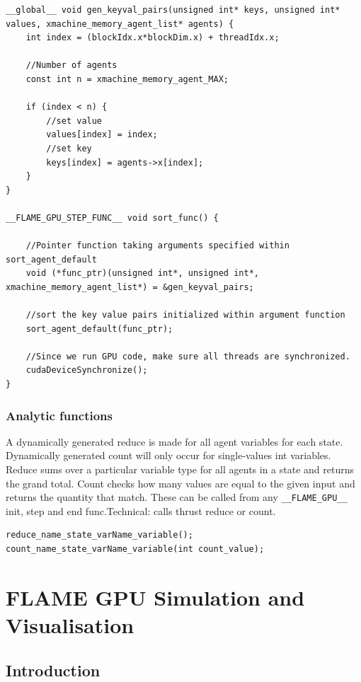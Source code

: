 \documentclass[11pt, a4paper, onecolumn, oneside]{report}
\begin{document}
\begin{verbatim}
__global__ void gen_keyval_pairs(unsigned int* keys, unsigned int* values, xmachine_memory_agent_list* agents) {
	int index = (blockIdx.x*blockDim.x) + threadIdx.x;

	//Number of agents
	const int n = xmachine_memory_agent_MAX;

	if (index < n) {
		//set value
		values[index] = index;
		//set key
		keys[index] = agents->x[index];
	}
}

__FLAME_GPU_STEP_FUNC__ void sort_func() {
	
	//Pointer function taking arguments specified within sort_agent_default
	void (*func_ptr)(unsigned int*, unsigned int*, xmachine_memory_agent_list*) = &gen_keyval_pairs;
    
	//sort the key value pairs initialized within argument function
	sort_agent_default(func_ptr);
	
    //Since we run GPU code, make sure all threads are synchronized.
	cudaDeviceSynchronize();
}
\end{verbatim}

\subsection{Analytic functions}
A dynamically generated reduce is made for all agent variables for each state. Dynamically generated count will only occur for single-values int variables. Reduce sums over a particular variable type for all agents in a state and returns the grand total. Count checks how many values are equal to the given input and returns the quantity that match. These can be called from any \texttt{__FLAME_GPU__} init, step and end func.Technical: calls thrust reduce or count. 

\begin{verbatim}
reduce_name_state_varName_variable();
count_name_state_varName_variable(int count_value);
\end{verbatim}



\chapter{FLAME GPU Simulation and Visualisation}
\label{ch:4}
\section{Introduction}
\label{sec:41}
\end{document}
